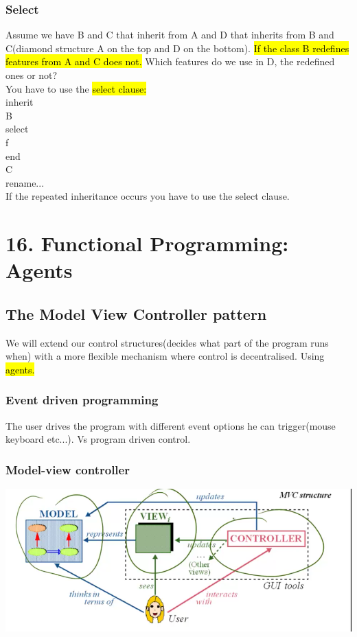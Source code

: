 \documentclass[11pt]{article}
\newcommand\tab[1][1cm]{\hspace*{#1}}
\begin{document}
\subsubsection{Select}
Assume we have B and C that inherit from A and D that inherits from B and C(diamond structure A on the top and D on the bottom). \hl{If the class B redefines features from A and C does not.} Which features do we use in D, the redefined ones or not?\\You have to use the \hl{select clause:}\\inherit\\\tab B\\\tab\tab select\\\tab\tab\tab f\\\tab\tab end\\\tab C\\\tab\tab rename...\\
If the repeated inheritance occurs you have to use the select clause.
\section{16. Functional Programming: Agents}
\subsection{The Model View Controller pattern}
We will extend our control structures(decides what part of the program runs when) with a more flexible mechanism where control is decentralised. Using \hl{agents.}
\subsubsection{Event driven programming}
The user drives the program with different event options he can trigger(mouse keyboard etc...). Vs program driven control.
\subsubsection{Model-view controller}
\begin{center}
	\includegraphics[width = 15cm]{Eprog/model}
\end{center}
\end{document}
